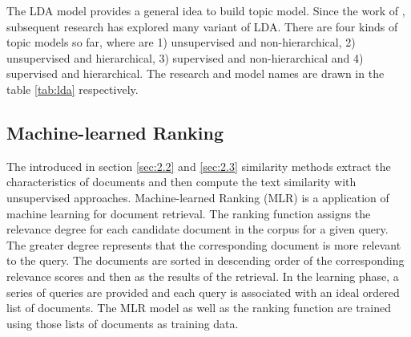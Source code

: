The LDA model provides a general idea to build topic model. Since the work of \cite{Blei:2003}, subsequent research has explored many variant of LDA. There are four kinds of topic models so far, where are 1) unsupervised and non-hierarchical, 2) unsupervised and hierarchical, 3) supervised and non-hierarchical and 4) supervised and hierarchical. The research and model names are drawn in the table \ref{tab:lda} respectively.

\begin{table}[!htb]
\centering
{}
\caption{Topic Models Variant of LDA}
\label{tab:lda}
\end{table}

\subsection{Machine-learned Ranking}
\label{sec:2.4}

The introduced in section \ref{sec:2.2} and \ref{sec:2.3} similarity methods extract the characteristics of documents and then compute the text similarity with unsupervised approaches. Machine-learned Ranking (MLR) is a application of machine learning for document retrieval. The ranking function assigns the relevance degree for each candidate document in the corpus for a given query. The greater degree represents that the corresponding document is more relevant to the query. The documents are sorted in descending order of the corresponding relevance scores and then as the results of the retrieval. In the learning phase, a series of queries are provided and each query is associated with an ideal ordered list of documents. The MLR model as well as the ranking function are trained using those lists of documents as training data. 

